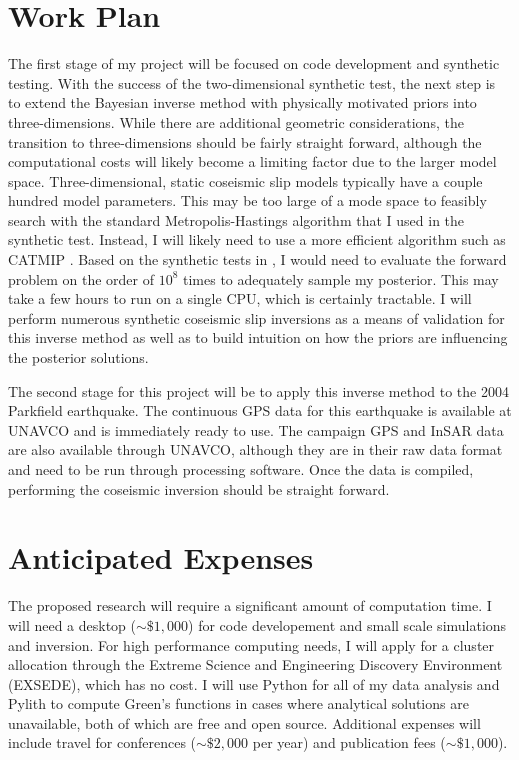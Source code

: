 \documentclass[12pt]{article}
\begin{document}
\section*{Work Plan}
The first stage of my project will be focused on code development and synthetic testing.  With the success of the two-dimensional synthetic test, the next step is to extend the Bayesian inverse method with physically motivated priors into three-dimensions.  While there are additional geometric considerations, the transition to three-dimensions should be fairly straight forward, although the computational costs will likely become a limiting factor due to the larger model space.  Three-dimensional, static coseismic slip models typically have a couple hundred model parameters.  This may be too large of a mode space to feasibly search with the standard Metropolis-Hastings algorithm that I used in the synthetic test.  Instead, I will likely need to use a more efficient algorithm such as CATMIP \citep{Minson2013}.  Based on the synthetic tests in \citep{Minson2013}, I would need to evaluate the forward problem on the order of $10^{8}$ times to adequately sample my posterior.  This may take a few hours to run on a single CPU, which is certainly tractable.  I will perform numerous synthetic coseismic slip inversions as a means of validation for this inverse method as well as to build intuition on how the priors are influencing the posterior solutions.

The second stage for this project will be to apply this inverse method to the 2004 Parkfield earthquake.  The continuous GPS data for this earthquake is available at UNAVCO and is immediately ready to use.  The campaign GPS and InSAR data are also available through UNAVCO, although they are in their raw data format and need to be run through processing software. Once the data is compiled, performing the coseismic inversion should be straight forward.        

\section*{Anticipated Expenses}
The proposed research will require a significant amount of computation time.  I will need a desktop (${\sim}\$1,000$) for code developement and small scale simulations and inversion.  For high performance computing needs, I will apply for a cluster allocation through the Extreme Science and Engineering Discovery Environment (EXSEDE), which has no cost.  I will use Python for all of my data analysis and Pylith \citep{Aagaard2013} to compute Green's functions in cases where analytical solutions are unavailable, both of which are free and open source.  Additional expenses will include travel for conferences (${\sim}\$2,000$ per year) and publication fees (${\sim}\$1,000$).  



%


\end{document}
